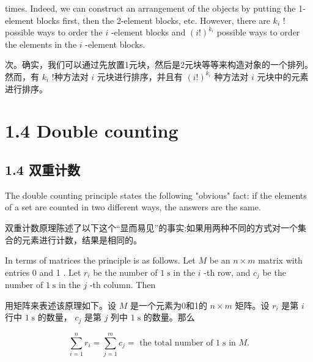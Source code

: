 \documentclass[10pt]{article}
\begin{document}
times. Indeed, we can construct an arrangement of the objects by putting the 1-element blocks first, then the 2-element blocks, etc. However, there are \({k}_{i}\) ! possible ways to order the \(i\) -element blocks and \({\left( i!\right) }^{{k}_{i}}\) possible ways to order the elements in the \(i\) -element blocks.

\begin{tcolorbox}\relax
次。确实，我们可以通过先放置1元块，然后是2元块等等来构造对象的一个排列。然而，有 \({k}_{i}\) !种方法对 \(i\) 元块进行排序，并且有 \({\left( i!\right) }^{{k}_{i}}\) 种方法对 \(i\) 元块中的元素进行排序。
\end{tcolorbox}

\section*{1.4 Double counting}

\begin{tcolorbox}\relax
\section*{1.4 双重计数}
\end{tcolorbox}

The double counting principle states the following "obvious" fact: if the elements of a set are counted in two different ways, the answers are the same.

\begin{tcolorbox}\relax
双重计数原理陈述了以下这个“显而易见”的事实:如果用两种不同的方式对一个集合的元素进行计数，结果是相同的。
\end{tcolorbox}

In terms of matrices the principle is as follows. Let \(M\) be an \(n \times  m\) matrix with entries 0 and 1 . Let \({r}_{i}\) be the number of \(1\mathrm{\;s}\) in the \(i\) -th row, and \({c}_{j}\) be the number of \(1\mathrm{\;s}\) in the \(j\) -th column. Then

\begin{tcolorbox}\relax
用矩阵来表述该原理如下。设 \(M\) 是一个元素为0和1的 \(n \times  m\) 矩阵。设 \({r}_{i}\) 是第 \(i\) 行中 \(1\mathrm{\;s}\) 的数量， \({c}_{j}\) 是第 \(j\) 列中 \(1\mathrm{\;s}\) 的数量。那么
\end{tcolorbox}

\[
\mathop{\sum }\limits_{{i = 1}}^{n}{r}_{i} = \mathop{\sum }\limits_{{j = 1}}^{m}{c}_{j} = \text{ the total number of }1\mathrm{\;s}\text{ in }M.
\]
\end{document}
